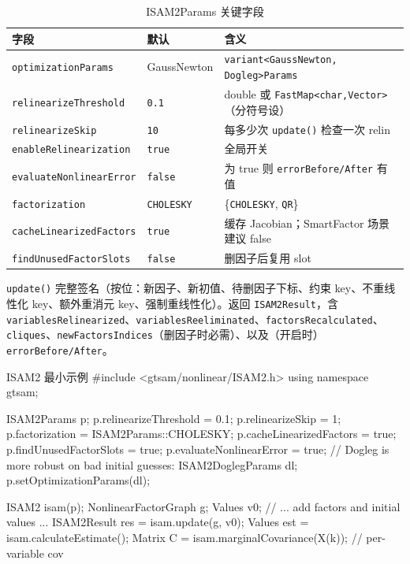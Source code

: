 \begin{table}[H]\centering\small
\caption{ISAM2Params 关键字段}
\label{tab:isam2params}
\begin{tabular}{lll}
\toprule
字段 & 默认 & 含义 \\
\midrule
\texttt{optimizationParams} & GaussNewton & \texttt{variant<GaussNewton, Dogleg>Params} \\
\texttt{relinearizeThreshold} & \texttt{0.1} & double 或 \texttt{FastMap<char,Vector>}（分符号设） \\
\texttt{relinearizeSkip} & \texttt{10} & 每多少次 \texttt{update()} 检查一次 relin \\
\texttt{enableRelinearization} & \texttt{true} & 全局开关 \\
\texttt{evaluateNonlinearError} & \texttt{false} & 为 true 则 \texttt{errorBefore/After} 有值 \\
\texttt{factorization} & \texttt{CHOLESKY} & \{\texttt{CHOLESKY}, \texttt{QR}\} \\
\texttt{cacheLinearizedFactors} & \texttt{true} & 缓存 Jacobian；SmartFactor 场景建议 false \\
\texttt{findUnusedFactorSlots} & \texttt{false} & 删因子后复用 slot \\
\bottomrule
\end{tabular}
\end{table}

\noindent \texttt{update()} 完整签名（按位：新因子、新初值、待删因子下标、约束 key、不重线性化 key、额外重消元 key、强制重线性化）。返回 \texttt{ISAM2Result}，含 \texttt{variablesRelinearized}、\texttt{variablesReeliminated}、\texttt{factorsRecalculated}、\texttt{cliques}、\texttt{newFactorsIndices}（删因子时必需）、以及（开启时）\texttt{errorBefore/After}。

\begin{codebox}[C++]{ISAM2 最小示例}
#include <gtsam/nonlinear/ISAM2.h>
using namespace gtsam;

ISAM2Params p;
p.relinearizeThreshold   = 0.1;
p.relinearizeSkip        = 1;
p.factorization          = ISAM2Params::CHOLESKY;
p.cacheLinearizedFactors = true;
p.findUnusedFactorSlots  = true;
p.evaluateNonlinearError = true;
// Dogleg is more robust on bad initial guesses:
ISAM2DoglegParams dl; p.setOptimizationParams(dl);

ISAM2 isam(p);
NonlinearFactorGraph g; Values v0;
// ... add factors and initial values ...
ISAM2Result res = isam.update(g, v0);
Values est = isam.calculateEstimate();
Matrix C   = isam.marginalCovariance(X(k));   // per-variable cov
\end{codebox}

